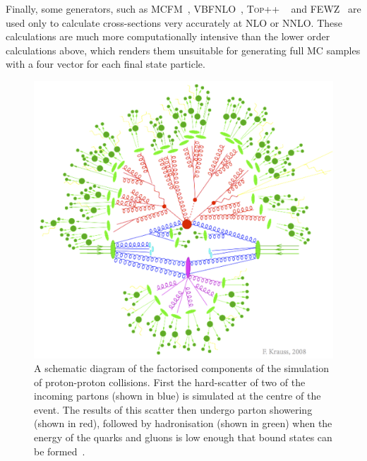 Finally, some generators, such as MCFM~\cite{PhysRevD.68.094021}, VBFNLO~\cite{Baglio:2014uba,Arnold:2011wj,Arnold20091661}, \textsc{Top++} ~\cite{Czakon20142930} and \textsc{FEWZ}~\cite{PhysRevD.86.094034} are used only to calculate cross-sections very accurately at \ac{NLO} or \ac{NNLO}. These calculations are much more computationally intensive than the lower order calculations above, which renders them unsuitable for generating full \ac{MC} samples with a four vector for each final state particle.

\begin{figure}
  \includegraphics[width=\largefigwidth]{plots/theory/factorisation.png}
  \caption[A schematic diagram of the factorised components of the simulation of proton-proton collisions. First the hard-scatter of two of the incoming partons (shown in blue) is simulated at the centre of the event. The results of this scatter then undergo parton showering (shown in red), followed by hadronisation (shown in green) when the energy of the quarks and gluons is low enough that bound states can be formed.]{A schematic diagram of the factorised components of the simulation of proton-proton collisions. First the hard-scatter of two of the incoming partons (shown in blue) is simulated at the centre of the event. The results of this scatter then undergo parton showering (shown in red), followed by hadronisation (shown in green) when the energy of the quarks and gluons is low enough that bound states can be formed~\cite{krauss-diag}.}
  \label{fig:factorisation}
\end{figure}

